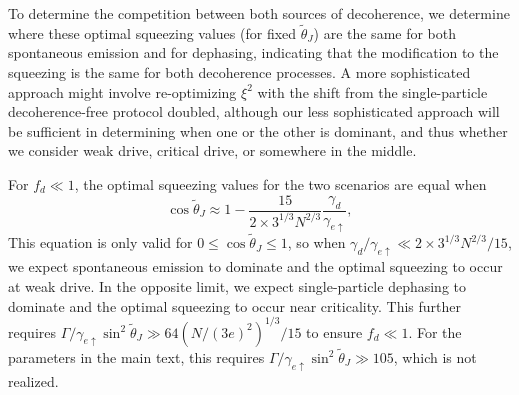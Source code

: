 To determine the competition between both sources of decoherence, we determine where these optimal squeezing values (for fixed $\tilde{\theta}_J$) are the same for both spontaneous emission and for dephasing, indicating that the modification to the squeezing is the same for both decoherence processes. A more sophisticated approach might involve re-optimizing $\xi^2$ with the shift from the single-particle decoherence-free protocol doubled, although our less sophisticated approach will be sufficient in determining when one or the other is dominant, and thus whether we consider weak drive, critical drive, or somewhere in the middle.

For $f_d \ll 1$, the optimal squeezing values for the two scenarios are equal when
\begin{equation}
     \cos \tilde{\theta}_J \approx 1- \frac{15 }{2 \times 3^{1/3}  N^{2/3}} \frac{\gamma_d}{\gamma_{e \uparrow}},
\end{equation}
This equation is only valid for $0 \leq \cos \tilde{\theta}_J \leq 1$, so when $\gamma_d/\gamma_{e \uparrow} \ll 2 \times 3^{1/3} N^{2/3}/15$, we expect spontaneous emission to dominate and the optimal squeezing to occur at weak drive. In the opposite limit, we expect single-particle dephasing to dominate and the optimal squeezing to occur near criticality. This further requires $ \Gamma/\gamma_{e \uparrow} \sin^2 \tilde{\theta}_J \gg 64 (N/(3e)^2)^{1/3}/15$ to ensure $f_d \ll 1$. For the parameters in the main text, this requires $\Gamma/\gamma_{e \uparrow} \sin^2 \tilde{\theta}_J \gg 105$, which is not realized. 

